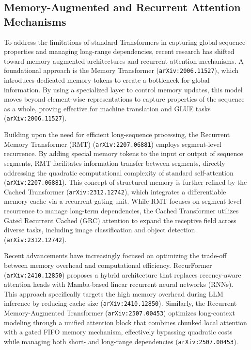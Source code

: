 \documentclass[11pt]{article}
\begin{document}
\subsection{Memory-Augmented and Recurrent Attention Mechanisms}

To address the limitations of standard Transformers in capturing global sequence properties and managing long-range dependencies, recent research has shifted toward memory-augmented architectures and recurrent attention mechanisms. A foundational approach is the Memory Transformer (\texttt{arXiv:2006.11527}), which introduces dedicated memory tokens to create a bottleneck for global information. By using a specialized layer to control memory updates, this model moves beyond element-wise representations to capture properties of the sequence as a whole, proving effective for machine translation and GLUE tasks (\texttt{arXiv:2006.11527}).

Building upon the need for efficient long-sequence processing, the Recurrent Memory Transformer (RMT) (\texttt{arXiv:2207.06881}) employs segment-level recurrence. By adding special memory tokens to the input or output of sequence segments, RMT facilitates information transfer between segments, directly addressing the quadratic computational complexity of standard self-attention (\texttt{arXiv:2207.06881}). This concept of structured memory is further refined by the Cached Transformer (\texttt{arXiv:2312.12742}), which integrates a differentiable memory cache via a recurrent gating unit. While RMT focuses on segment-level recurrence to manage long-term dependencies, the Cached Transformer utilizes Gated Recurrent Cached (GRC) attention to expand the receptive field across diverse tasks, including image classification and object detection (\texttt{arXiv:2312.12742}).

Recent advancements have increasingly focused on optimizing the trade-off between memory overhead and computational efficiency. RecurFormer (\texttt{arXiv:2410.12850}) proposes a hybrid architecture that replaces recency-aware attention heads with Mamba-based linear recurrent neural networks (RNNs). This approach specifically targets the high memory overhead during LLM inference by reducing cache size (\texttt{arXiv:2410.12850}). Similarly, the Recurrent Memory-Augmented Transformer (\texttt{arXiv:2507.00453}) optimizes long-context modeling through a unified attention block that combines chunked local attention with a gated FIFO memory mechanism, effectively bypassing quadratic costs while managing both short- and long-range dependencies (\texttt{arXiv:2507.00453}).
\end{document}
